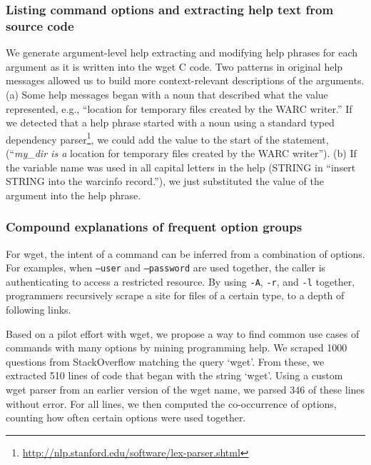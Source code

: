 \subsubsection{Listing command options and extracting help text from source code}

We generate argument-level help extracting and modifying help phrases for each argument as it is written into the wget C code.
Two patterns in original help messages allowed us to build more context-relevant descriptions of the arguments.
(a) Some help messages began with a noun that described what the value represented, e.g., ``location for temporary files created by the WARC writer.''
If we detected that a help phrase started with a noun using a standard typed dependency parser\footnote{\url{http://nlp.stanford.edu/software/lex-parser.shtml}}, we could add the value to the start of the statement, (``\emph{my\_dir is a} location for temporary files created by the WARC writer'').
(b) If the variable name was used in all capital letters in the help (STRING in ``insert STRING into the warcinfo record.''), we just substituted the value of the argument into the help phrase.

\subsubsection{Compound explanations of frequent option groups}

For wget, the intent of a command can be inferred from a combination of options.
For examples, when \texttt{--user} and \texttt{--password} are used together, the caller is authenticating to access a restricted resource.
By using \texttt{-A}, \texttt{-r}, and \texttt{-l} together, programmers recursively scrape a site for files of a certain type, to a depth of following links.

Based on a pilot effort with wget, we propose a way to find common use cases of commands with many options by mining programming help.
We scraped 1000 questions from StackOverflow matching the query `wget'.
From these, we extracted 510 lines of code that began with the string `wget'.
Using a custom wget parser from an earlier version of the wget \Gls{name}, we parsed 346 of these lines without error.
For all lines, we then computed the co-occurrence of options, counting how often certain options were used together.

